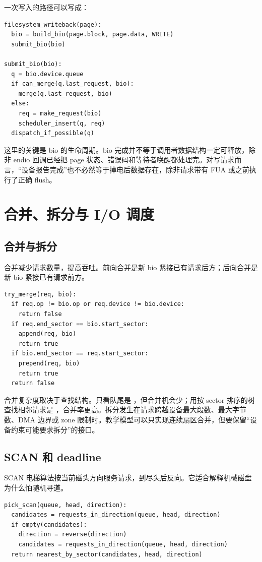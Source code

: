 一次写入的路径可以写成：

\begin{lstlisting}
filesystem_writeback(page):
  bio = build_bio(page.block, page.data, WRITE)
  submit_bio(bio)

submit_bio(bio):
  q = bio.device.queue
  if can_merge(q.last_request, bio):
    merge(q.last_request, bio)
  else:
    req = make_request(bio)
    scheduler_insert(q, req)
  dispatch_if_possible(q)
\end{lstlisting}

这里的关键是 bio 的生命周期。bio 完成并不等于调用者数据结构一定可释放，除非 endio 回调已经把 page 状态、错误码和等待者唤醒都处理完。对写请求而言，“设备报告完成”也不必然等于掉电后数据存在，除非请求带有 FUA 或之前执行了正确 flush。

\section{合并、拆分与 I/O 调度}

\subsection{合并与拆分}

合并减少请求数量，提高吞吐。前向合并是新 bio 紧接已有请求后方；后向合并是新 bio 紧接已有请求前方。

\begin{lstlisting}
try_merge(req, bio):
  if req.op != bio.op or req.device != bio.device:
    return false
  if req.end_sector == bio.start_sector:
    append(req, bio)
    return true
  if bio.end_sector == req.start_sector:
    prepend(req, bio)
    return true
  return false
\end{lstlisting}

合并复杂度取决于查找结构。只看队尾是 ，但合并机会少；用按 sector 排序的树查找相邻请求是 ，合并率更高。拆分发生在请求跨越设备最大段数、最大字节数、DMA 边界或 zone 限制时。教学模型可以只实现连续扇区合并，但要保留“设备约束可能要求拆分”的接口。

\subsection{SCAN 和 deadline}

SCAN 电梯算法按当前磁头方向服务请求，到尽头后反向。它适合解释机械磁盘为什么怕随机寻道。

\begin{lstlisting}
pick_scan(queue, head, direction):
  candidates = requests_in_direction(queue, head, direction)
  if empty(candidates):
    direction = reverse(direction)
    candidates = requests_in_direction(queue, head, direction)
  return nearest_by_sector(candidates, head, direction)
\end{lstlisting}

